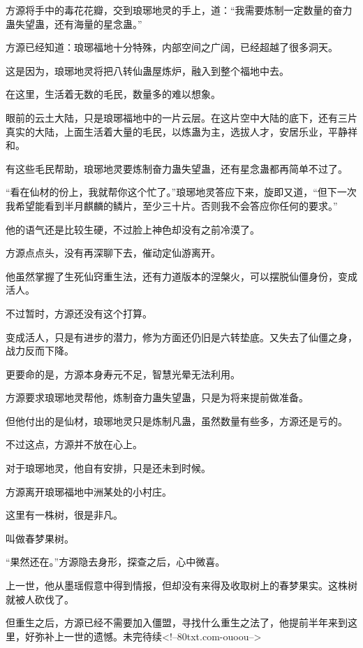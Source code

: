 \begin{this_body}
方源将手中的毒花花瓣，交到琅琊地灵的手上，道：“我需要炼制一定数量的奋力蛊失望蛊，还有海量的星念蛊。”

方源已经知道：琅琊福地十分特殊，内部空间之广阔，已经超越了很多洞天。

这是因为，琅琊地灵将把八转仙蛊屋炼炉，融入到整个福地中去。

在这里，生活着无数的毛民，数量多的难以想象。

眼前的云土大陆，只是琅琊福地中的一片云层。在这片空中大陆的底下，还有三片真实的大陆，上面生活着大量的毛民，以炼蛊为主，选拔人才，安居乐业，平静祥和。

有这些毛民帮助，琅琊地灵要炼制奋力蛊失望蛊，还有星念蛊都再简单不过了。

“看在仙材的份上，我就帮你这个忙了。”琅琊地灵答应下来，旋即又道，“但下一次我希望能看到半月麒麟的鳞片，至少三十片。否则我不会答应你任何的要求。”

他的语气还是比较生硬，不过脸上神色却没有之前冷漠了。

方源点点头，没有再深聊下去，催动定仙游离开。

他虽然掌握了生死仙窍重生法，还有力道版本的涅槃火，可以摆脱仙僵身份，变成活人。

不过暂时，方源还没有这个打算。

变成活人，只是有进步的潜力，修为方面还仍旧是六转垫底。又失去了仙僵之身，战力反而下降。

更要命的是，方源本身寿元不足，智慧光晕无法利用。

方源要求琅琊地灵帮他，炼制奋力蛊失望蛊，只是为将来提前做准备。

但他付出的是仙材，琅琊地灵只是炼制凡蛊，虽然数量有些多，方源还是亏的。

不过这点，方源并不放在心上。

对于琅琊地灵，他自有安排，只是还未到时候。

方源离开琅琊福地中洲某处的小村庄。

这里有一株树，很是非凡。

叫做春梦果树。

“果然还在。”方源隐去身形，探查之后，心中微喜。

上一世，他从墨瑶假意中得到情报，但却没有来得及收取树上的春梦果实。这株树就被人砍伐了。

但重生之后，方源已经不需要加入僵盟，寻找什么重生之法了，他提前半年来到这里，好弥补上一世的遗憾。未完待续<!--80txt.com-ouoou-->

\end{this_body}

